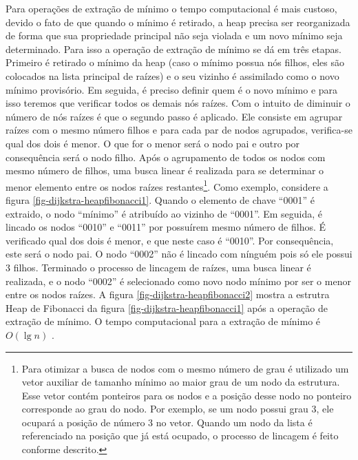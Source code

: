 Para operações de extração de mínimo o tempo computacional é mais custoso, devido o fato de que quando o mínimo é retirado, a heap precisa ser reorganizada de forma que sua propriedade principal não seja violada e um novo mínimo seja determinado. Para isso a operação de extração de mínimo se dá em três etapas. Primeiro é retirado o mínimo da heap (caso o mínimo possua nós filhos, eles são colocados na lista principal de raízes) e o seu vizinho é assimilado como o novo mínimo provisório. Em seguida, é preciso definir quem é o novo mínimo e para isso teremos que verificar todos os demais nós raízes. Com o intuito de diminuir o número de nós raízes é que o segundo passo é aplicado.  Ele consiste em agrupar raízes com o mesmo número filhos e para cada par de nodos agrupados, verifica-se qual dos dois é menor. O que for o menor será o nodo pai e outro por consequência será o nodo filho. Após o agrupamento de todos os nodos com mesmo número de filhos, uma busca linear é realizada para se determinar o menor elemento entre os nodos raízes restantes\footnote{Para otimizar a busca de nodos com o mesmo número de grau é utilizado um vetor auxiliar de tamanho mínimo ao maior grau de um nodo da estrutura. Esse vetor contém ponteiros para os nodos e a posição desse nodo no ponteiro corresponde ao grau do nodo. Por exemplo, se um nodo possui grau 3, ele ocupará a posição de número 3 no vetor. Quando um nodo da lista é referenciado na posição que já está ocupado, o processo de lincagem é feito conforme descrito.}. Como exemplo, considere a figura \ref{fig-dijkstra-heapfibonacci1}. Quando o elemento de chave ``0001'' é extraido, o nodo ``mínimo'' é atribuído ao vizinho de ``0001''. Em seguida, é lincado os nodos ``0010'' e ``0011'' por possuírem mesmo número de filhos. É verificado qual dos dois é menor, e que neste caso é ``0010''. Por consequência, este será o nodo pai. O nodo ``0002'' não é lincado com nínguém pois só ele possui 3 filhos. Terminado o processo de lincagem de raízes, uma busca linear é realizada, e o nodo ``0002'' é selecionado como novo nodo mínimo por ser o menor entre os nodos raízes. A figura \ref{fig-dijkstra-heapfibonacci2} mostra a estrutra Heap de Fibonacci da figura \ref{fig-dijkstra-heapfibonacci1} após a operação de extração de mínimo. O tempo computacional para a extração de mínimo é $O(\lg n)$ \cite{cormen2009introduction}.


